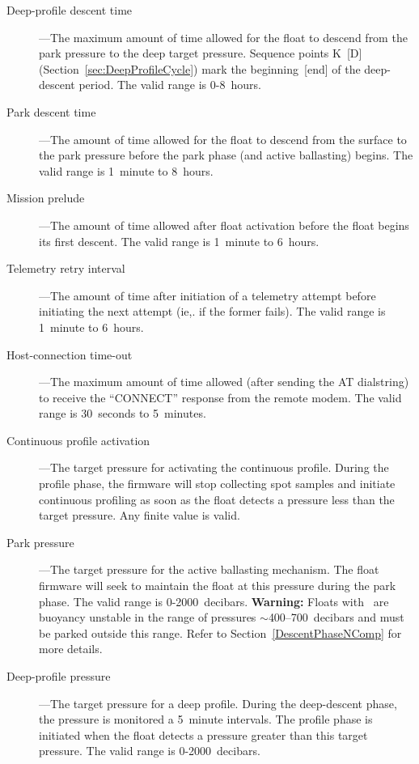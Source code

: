 \begin{description}
\item[Deep-profile descent time]---The maximum amount of time allowed for
  the float to descend from the park pressure to the deep target pressure.
  Sequence points K~[D] (Section~\ref{sec:DeepProfileCycle}) mark the
  beginning~[end] of the deep-descent period.  The valid range is 0-8~hours.

\item[Park descent time]---The amount of time allowed for the float to
  descend from the surface to the park pressure before the park phase (and
  active ballasting) begins.  The valid range is 1~minute to 8~hours.

\item[Mission prelude]---The amount of time allowed after float activation
  before the float begins its first descent.  The valid range is 1~minute to
  6~hours.

\item[Telemetry retry interval]---The amount of time after initiation of a
  telemetry attempt before initiating the next attempt (ie,. if the former
  fails). The valid range is 1~minute to 6~hours.

\item[Host-connection time-out]---The maximum amount of time allowed (after
  sending the AT dialstring) to receive the ``CONNECT'' response from the
  remote modem.  The valid range is 30~seconds to 5~minutes.

\item[Continuous profile activation]---The target pressure for activating
  the continuous profile.  During the profile phase, the firmware will stop
  collecting spot samples and initiate continuous profiling as soon as
  the float detects a pressure less than the target pressure.  Any finite
  value is valid.

\item[Park pressure]---The target pressure for the active ballasting
  mechanism.  The float firmware will seek to maintain the float at this
  pressure during the park phase.  The valid range is 0-2000~decibars.
  \textbf{Warning:} Floats with \NComp\ are buoyancy unstable in the range
  of pressures \mbox{$\sim$400--700~decibars} and must be parked outside
  this range.  Refer to Section~\ref{DescentPhaseNComp} for more details.


\item[Deep-profile pressure]---The target pressure for a deep profile.
  During the deep-descent phase, the pressure is monitored a 5~minute
  intervals.  The profile phase is initiated when the float detects a
  pressure greater than this target pressure.  The valid range is
  0-2000~decibars.


\end{description}
